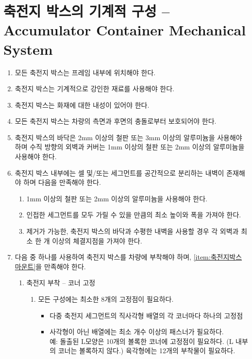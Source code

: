 \documentclass[final,a4paper,10pt]{report}
\begin{document}
\section{축전지 박스의 기계적 구성 – Accumulator Container Mechanical System}
\begin{enumerate}
  \item 모든 축전지 박스는 프레임 내부에 위치해야 한다.
  \item 축전지 박스는 기계적으로 강인한 재료를 사용해야 한다.
  \item 축전지 박스는 화재에 대한 내성이 있어야 한다.
  \item 모든 축전지 박스는 차량의 측면과 후면의 충돌로부터 보호되어야 한다.
  \item 축전지 박스의 바닥은 2mm 이상의 철판 또는 3mm 이상의 알루미늄을 사용해야 하며 수직 방향의 외벽과 커버는 1mm 이상의 철판 또는 2mm 이상의 알루미늄을 사용해야 한다.
  
  \item 축전지 박스 내부에는 셀 및/또는 세그먼트를 공간적으로 분리하는 내벽이 존재해야 하며 다음을 만족해야 한다.
    \begin{enumerate}
      \item 1mm 이상의 철판 또는 2mm 이상의 알루미늄을 사용해야 한다.
      \item 인접한 세그먼트를 모두 가릴 수 있을 만큼의 최소 높이와 폭을 가져야 한다.
      \item 제거가 가능한, 축전지 박스의 바닥과 수평한 내벽을 사용할 경우 각 외벽과 최소 한 개 이상의 체결지점을 가져야 한다.
    \end{enumerate}
    
  \item 다음 중 하나를 사용하여 축전지 박스를 차량에 부착해야 하며, \cref{item:축전지박스 마운트}을 만족해야 한다. \label{item:축전지박스 하중}
    \begin{enumerate}
      \item 축전지 부착 – 코너 고정
        \begin{enumerate}
          \item 모든 구성에는 최소한 8개의 고정점이 필요하다.  
            \begin{itemize}
              \item 다중 축전지 세그먼트의 직사각형 배열의 각 코너마다 하나의 고정점  
              \item 사각형이 아닌 배열에는 최소 개수 이상의 패스너가 필요하다.\\
                예: 돌출된 L모양은 10개의 볼록한 코너에 고정점이 필요하다. (L 내부의 코너는 볼록하지 않다.) 육각형에는 12개의 부착물이 필요하다.
            \end{itemize}
            

\end{enumerate}
\end{enumerate}
\end{enumerate}
\end{document}
